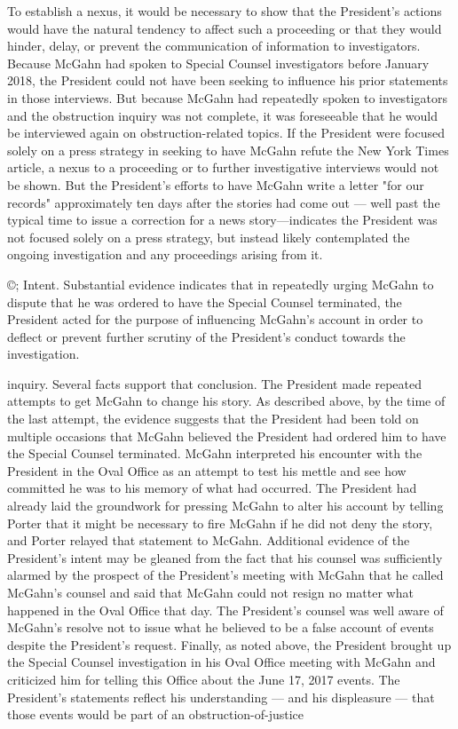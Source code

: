 To establish a nexus, it would be necessary to show that the President's actions would have the natural tendency to affect such a proceeding or that they would hinder, delay, or prevent the communication of information to investigators.
Because McGahn had spoken to Special Counsel investigators before January 2018, the President could not have been seeking to influence his prior statements in those interviews.
But because McGahn had repeatedly spoken to investigators and the obstruction inquiry was not complete, it was foreseeable that he would be interviewed again on obstruction-related topics.
If the President were focused solely on a press strategy in seeking to have McGahn refute the New York Times article, a nexus to a proceeding or to further investigative interviews would not be shown.
But the President's efforts to have McGahn write a letter "for our records" approximately ten days after the stories had come out — well past the typical time to issue a correction for a news story—indicates the President was not focused solely on a press strategy, but instead likely contemplated the ongoing investigation and any proceedings arising from it.

©; Intent.
Substantial evidence indicates that in repeatedly urging McGahn to dispute that he was ordered to have the Special Counsel terminated, the President acted for the purpose of influencing McGahn's account in order to deflect or prevent further scrutiny of the President's conduct towards the investigation.

inquiry.
Several facts support that conclusion.
The President made repeated attempts to get McGahn to change his story.
As described above, by the time of the last attempt, the evidence suggests that the President had been told on multiple occasions that McGahn believed the President had ordered him to have the Special Counsel terminated.
McGahn interpreted his encounter with the President in the Oval Office as an attempt to test his mettle and see how committed he was to his memory of what had occurred.
The President had already laid the groundwork for pressing McGahn to alter his account by telling Porter that it might be necessary to fire McGahn if he did not deny the story, and Porter relayed that statement to McGahn.
Additional evidence of the President's intent may be gleaned from the fact that his counsel was sufficiently alarmed by the prospect of the President's meeting with McGahn that he called McGahn's counsel and said that McGahn could not resign no matter what happened in the Oval Office that day.
The President's counsel was well aware of McGahn's resolve not to issue what he believed to be a false account of events despite the President's request.
Finally, as noted above, the President brought up the Special Counsel investigation in his Oval Office meeting with McGahn and criticized him for telling this Office about the June 17, 2017 events.
The President's statements reflect his understanding — and his displeasure — that those events would be part of an obstruction-of-justice

